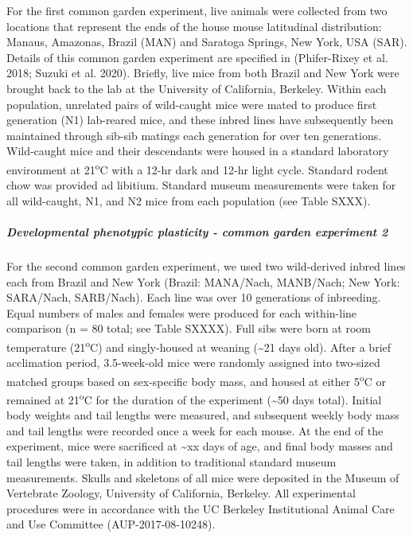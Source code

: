 \documentclass[]{article}
\let\oldsubparagraph\subparagraph
\renewcommand{\subparagraph}[1]{\oldsubparagraph{#1}\mbox{}}
\begin{document}
For the first common garden experiment, live animals were collected from
two locations that represent the ends of the house mouse latitudinal
distribution: Manaus, Amazonas, Brazil (MAN) and Saratoga Springs, New
York, USA (SAR). Details of this common garden experiment are specified
in (Phifer-Rixey et al. 2018; Suzuki et al. 2020). Briefly, live mice
from both Brazil and New York were brought back to the lab at the
University of California, Berkeley. Within each population, unrelated
pairs of wild-caught mice were mated to produce first generation (N1)
lab-reared mice, and these inbred lines have subsequently been
maintained through sib-sib matings each generation for over ten
generations. Wild-caught mice and their descendants were housed in a
standard laboratory environment at 21\textsuperscript{o}C with a 12-hr
dark and 12-hr light cycle. Standard rodent chow was provided ad
libitium. Standard museum measurements were taken for all wild-caught,
N1, and N2 mice from each population (see Table SXXX).

\hypertarget{developmental-phenotypic-plasticity---common-garden-experiment-2}{%
\subparagraph{\texorpdfstring{\emph{Developmental phenotypic plasticity
- common garden experiment
2}}{Developmental phenotypic plasticity - common garden experiment 2}}\label{developmental-phenotypic-plasticity---common-garden-experiment-2}}

For the second common garden experiment, we used two wild-derived inbred
lines each from Brazil and New York (Brazil: MANA/Nach, MANB/Nach; New
York: SARA/Nach, SARB/Nach). Each line was over 10 generations of
inbreeding. Equal numbers of males and females were produced for each
within-line comparison (n = 80 total; see Table SXXXX). Full sibs were
born at room temperature (21\textsuperscript{o}C) and singly-housed at
weaning (\textasciitilde{}21 days old). After a brief acclimation
period, 3.5-week-old mice were randomly assigned into two-sized matched
groups based on sex-specific body mass, and housed at either
5\textsuperscript{o}C or remained at 21\textsuperscript{o}C for the
duration of the experiment (\textasciitilde{}50 days total). Initial
body weights and tail lengths were measured, and subsequent weekly body
mass and tail lengths were recorded once a week for each mouse. At the
end of the experiment, mice were sacrificed at \textasciitilde{}xx days
of age, and final body masses and tail lengths were taken, in addition
to traditional standard museum measurements. Skulls and skeletons of all
mice were deposited in the Museum of Vertebrate Zoology, University of
California, Berkeley. All experimental procedures were in accordance
with the UC Berkeley Institutional Animal Care and Use Committee
(AUP-2017-08-10248).
\end{document}
